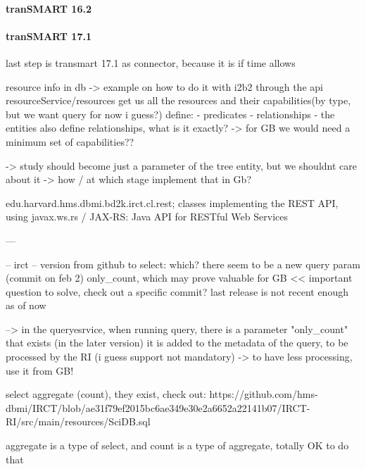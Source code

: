 \paragraph{tranSMART 16.2}

\paragraph{tranSMART 17.1}
last step is transmart 17.1 as connector, because it is if time allows


resource info in db -> example on how to do it with i2b2
through the api resourceService/resources get us all the resources and their capabilities(by type, but we want query for now i guess?)
define:
- predicates
- relationships
- the entities also define relationships, what is it exactly?
-> for GB we would need a minimum set of capabilities??

-> study should become just a parameter of the tree entity, but we shouldnt care about it
-> how / at which stage implement that in Gb?

edu.harvard.hms.dbmi.bd2k.irct.cl.rest;
classes implementing the REST API, using javax.ws.rs / JAX-RS: Java API for RESTful Web Services

---

-- irct --
version from github to select: which? there seem to be a new query param (commit on feb 2) only\_count, which may prove valuable for GB << important question to solve, check out a specific commit? last release is not recent enough as of now 

--> in the queryesrvice, when running query, there is a parameter "only\_count" that exists (in the later version)
it is added to the metadata of the query, to be processed by the RI (i guess support not mandatory) 
-> to have less processing, use it from GB!

select aggregate (count), they exist, check out: https://github.com/hms-dbmi/IRCT/blob/ae31f79ef2015bc6ae349e30e2a6652a22141b07/IRCT-RI/src/main/resources/SciDB.sql

aggregate is a type of select, and count is a type of aggregate, totally OK to do that 



